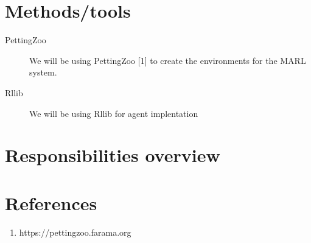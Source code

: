 \documentclass{article}
\begin{document}
\section{Methods/tools}
\begin{description}

  \item[PettingZoo] We will be using PettingZoo [1] to create the environments for the MARL system.
  \item[Rllib] We will be using Rllib for agent implentation
\end{description}


\section{Responsibilities overview}


\section*{References}
\begin{enumerate}
  \item https://pettingzoo.farama.org
\end{enumerate}
\end{document}
